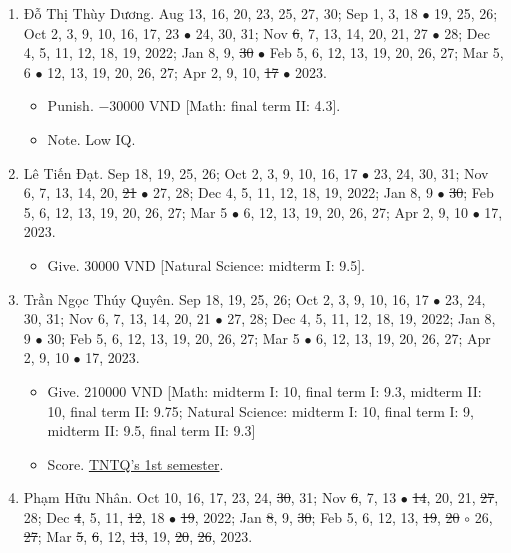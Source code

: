 \documentclass{article}
\begin{document}
\begin{enumerate}
	\item {\sc Đỗ Thị Thùy Dương.} {\sf[In]} Aug 13, 16, 20, 23, 25, 27, 30; Sep 1, 3, 18 $\bullet$ 19, 25, 26; Oct 2, 3, 9, 10, 16, 17, 23 $\bullet$ 24, 30, 31; Nov \st{6}, 7, 13, 14, 20, 21, 27 $\bullet$ 28; Dec 4, 5, 11, 12, 18, 19, 2022; Jan 8, 9, \st{30} $\bullet$ Feb 5, 6, 12, 13, 19, 20, 26, 27; Mar 5, 6 $\bullet$ 12, 13, 19, 20, 26, 27; Apr 2, 9, 10, \st{17} $\bullet$ 2023. {\sf[Out]}
	\begin{itemize}
		\item {\sf Punish.} $-30000$ VND [Math: final term II: 4.3].
		\item {\sf Note.} Low IQ.
	\end{itemize}	
	\item {\sc Lê Tiến Đạt.} {\sf[In]} Sep 18, 19, 25, 26; Oct 2, 3, 9, 10, 16, 17 $\bullet$ 23, 24, 30, 31; Nov 6, 7, 13, 14, 20, \st{21} $\bullet$ 27, 28; Dec 4, 5, 11, 12, 18, 19, 2022; Jan 8, 9 $\bullet$ \st{30}; Feb 5, 6, 12, 13, 19, 20, 26, 27; Mar 5 $\bullet$ 6, 12, 13, 19, 20, 26, 27; Apr 2, 9, 10 $\bullet$ 17, 2023.
	\begin{itemize}
		\item {\sf Give.} 30000 VND [Natural Science: midterm I: 9.5].
	\end{itemize}
	\item {\sc Trần Ngọc Thúy Quyên.} {\sf[In]} Sep 18, 19, 25, 26; Oct 2, 3, 9, 10, 16, 17 $\bullet$ 23, 24, 30, 31; Nov 6, 7, 13, 14, 20, 21 $\bullet$ 27, 28; Dec 4, 5, 11, 12, 18, 19, 2022; Jan 8, 9 $\bullet$ 30; Feb 5, 6, 12, 13, 19, 20, 26, 27; Mar 5 $\bullet$ 6, 12, 13, 19, 20, 26, 27; Apr 2, 9, 10 $\bullet$ 17, 2023.
	\begin{itemize}
		\item {\sf Give.} 210000 VND [Math: midterm I: 10, final term I: 9.3, midterm II: 10, final term II: 9.75; Natural Science: midterm I: 10, final term I: 9, midterm II: 9.5, final term II: 9.3]
		\item {\sf Score.} \href{https://github.com/NQBH/hobby/blob/master/STEM/student/Tran_Ngoc_Thuy_Quyen_grade_7_1st_semester.jpg}{TNTQ's 1st semester}.
	\end{itemize}
	\item {\sc Phạm Hữu Nhân.} {\sf[In]} Oct 10, 16, 17, 23, 24, \st{30}, 31; Nov \st{6}, 7, 13 $\bullet$ \st{14}, 20, 21, \st{27}, 28; Dec \st{4}, 5, 11, \st{12}, 18 $\bullet$ \st{19}, 2022; Jan \st{8}, 9, \st{30}; Feb 5, 6, 12, 13, \st{19}, \st{20} $\circ$ 26, \st{27}; Mar \st{5}, \st{6}, 12, \st{13}, 19, \st{20}, \st{26}, 2023. {}

\end{enumerate}
\end{document}

